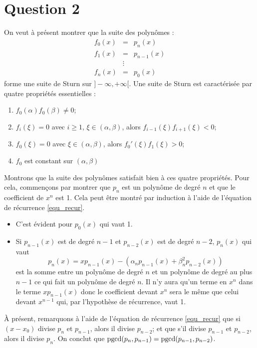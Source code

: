 \section*{Question 2}
On veut à présent montrer que la suite des polynômes :
$$
\begin{array}{ccc}
f_0(x) & = & p_n(x)\\
f_1(x) & = & p_{n-1}(x)\\
&\vdots &\\
f_n(x) & = & p_0(x)
\end{array}
$$
forme une suite de Sturn sur $] - \infty, +\infty[$. Une suite de Sturn est caractérisée par quatre propriétés essentielles :

\begin{enumerate}
  \item $f_0(\alpha) f_0(\beta) \neq 0$;
  \item $f_i( \xi)=0$ avec $i \geq 1$, $\xi \in (\alpha, \beta)$, alors $f_{i-1}( \xi) f_{i+1}( \xi) <0$;
  \item $f_0( \xi )=0 $ avec $\xi \in (\alpha, \beta)$, alors $f_0'( \xi ) f_1( \xi ) >0$;
  \item $f_0$ est constant sur $(\alpha, \beta)$
\end{enumerate}

Montrons que la suite des polynômes satisfait bien à ces quatre propriétés.
Pour cela, commençons par montrer que $p_n$ est un polynôme de degré $n$
et que le coefficient de $x^n$ est 1.
Cela peut être montré par induction à l'aide de l'équation de récurrence
\eqref{equ_recur}.

\begin{itemize}
  \item C'est évident pour $p_0(x)$ qui vaut 1.
  \item Si $p_{n-1}(x)$ est de degré $n-1$ et $p_{n-2}(x)$ est de degré
    $n-2$, $p_n(x)$ qui vaut
    \[ p_n(x) = xp_{n-1}(x) - (\alpha_np_{n-1}(x) + \beta_n^2p_{n-2}(x)) \]
    est la somme entre un polynôme de degré $n$ et un polynôme de
    degré au plus $n-1$ ce qui fait un polynôme de degré $n$.
    Il n'y aura qu'un terme en $x^n$ dans le terme $xp_{n-1}(x)$ donc
    le coefficient devant $x^n$ sera le même que celui devant $x^{n-1}$ qui,
    par l'hypothèse de récurrence, vaut 1.
\end{itemize}


À présent, remarquons à l'aide de l'équation de récurrence \eqref{equ_recur}
que si $(x-x_0)$ divise $p_n$ et $p_{n-1}$, alors il divise
$p_{n-2}$; et que s'il divise $p_{n-1}$ et $p_{n-2}$, alors il divise $p_n$.
On conclut que $\operatorname{pgcd}(p_n, p_{n-1}) = \operatorname{pgcd}(p_{n-1}, p_{n-2})$.


